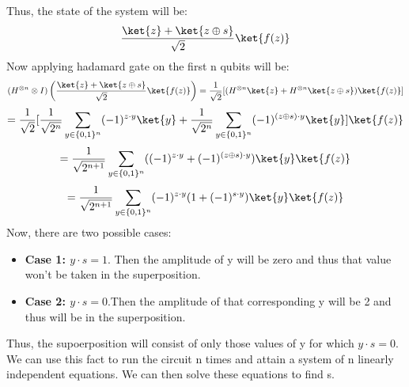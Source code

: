 \documentclass[12pt, oneside]{book}
\theoremstyle{definition}
\theoremstyle{definition}
\theoremstyle{remark}
\begin{document}
Thus, the state of the system will be:
\[
    \frac{\ket{z}+\ket{z\oplus s}}{\sqrt{2}}\ket{f(z)}
\]
Now applying hadamard gate on the first n qubits will be:
\[
    (H^{\otimes n}\otimes I)\left(\frac{\ket{z}+\ket{z\oplus s}}{\sqrt{2}}\ket{f(z)}\right)=\frac{1}{\sqrt{2}}[(H^{\otimes n}\ket{z}+H^{\otimes n}\ket{z\oplus s})\ket{f(z)}]
\]
\[
    =\frac{1}{\sqrt{2}}[\frac{1}{\sqrt{2^n}}\sum_{y \in \{0,1\}^n}(-1)^{z\cdot y}\ket{y}+\frac{1}{\sqrt{2^n}}\sum_{y \in \{0,1\}^n}(-1)^{(z\oplus s)\cdot y}\ket{y}]\ket{f(z)}
\]
\[
    =\frac{1}{\sqrt{2^{n+1}}}\sum_{y \in \{0,1\}^n}((-1)^{z\cdot y}+(-1)^{(z\oplus s) \cdot y})\ket{y}\ket{f(z)}
\]
\[
    =\frac{1}{\sqrt{2^{n+1}}}\sum_{y \in \{0,1\}^n}(-1)^{z\cdot y}(1+(-1)^{s\cdot y})\ket{y}\ket{f(z)}
\]
Now, there are two possible cases:
\begin{itemize}
    \item \textbf{Case 1: $y\cdot s=1$}. Then the amplitude of y will be zero and thus that value won't be taken in the superposition.
    \item \textbf{Case 2: $y\cdot s=0$}.Then the amplitude of that corresponding y will be 2 and thus will be in the superposition.
\end{itemize}
Thus, the supoerposition will consist of only those values of y for which $y\cdot s=0$.
We can use this fact to run the circuit n times and attain a system of n linearly independent equations. We can then solve these equations to find s.
\end{document}
